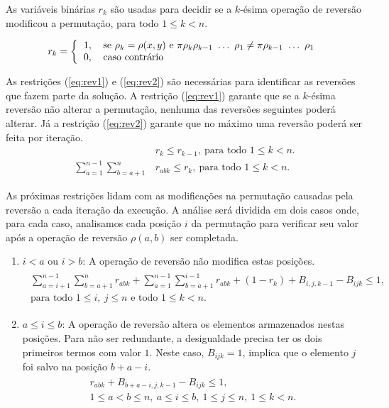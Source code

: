 As variáveis binárias $r_{k}$ são usadas para decidir se a $k$-ésima
operação de reversão modificou a permutação, para todo $ 1 \le k < n$.

\[
r_{k} = \left \{ 
\begin{tabular}{ll} 
 1, & se $\rho_{k} = \rho(x,y)$ e
 $\pi \rho_{k} \rho_{k-1}~\ldots~\rho_{1} \neq \pi \rho_{k-1}~\ldots~\rho_{1}$\\
 0, & caso contrário 
\end{tabular}
\right .
\]

As restrições (\ref{eq:rev1}) e (\ref{eq:rev2}) são necessárias para
identificar as reversões que fazem parte da solução. A restrição
(\ref{eq:rev1}) garante que se a $k$-ésima reversão não alterar a
permutação, nenhuma das reversões seguintes poderá alterar. Já a
restrição (\ref{eq:rev2}) garante que no máximo uma reversão poderá ser
feita por iteração.
\begin{align}
  &r_{k} \le r_{k-1},~\text{para todo $1 \le k <
  n$}. \label{eq:rev1} \\
  \sum_{a=1}^{n-1}\sum_{b=a+1}^{n}
  &r_{abk} \le r_{k},~\text{para todo $1 \le k < n$}. \label{eq:rev2}
\end{align}

As próximas restrições lidam com as modificações na permutação causadas
pela reversão a cada iteração da execução. A análise será dividida em
dois casos onde, para cada caso, analisamos cada posição $i$ da
permutação para verificar seu valor após a operação de reversão
$\rho(a,b)$ ser completada.
\begin{enumerate}
\item{$i < a$ ou $i > b$:
A operação de reversão não modifica estas posições.
\begin{align}
  \begin{split}
    \sum_{a=i+1}^{n-1}\sum_{b=a+1}^{n} r_{abk} +
    \sum_{a=1}^{n-1}\sum_{b=a+1}^{i-1} r_{abk} +
    (1 - r_{k}) + B_{i,j,k-1} - B_{ijk} \le 1, \\
    \text{para todo $1 \le i,~j \le n$ e todo $1 \le k < n$}.
  \end{split}
  \label{eq:rev3}
\end{align}}
\item{$a \le i \le b$:
A operação de reversão altera os elementos armazenados nestas posições.
Para não ser redundante, a desigualdade precisa ter os dois primeiros
termos com valor $1$. Neste caso, $B_{ijk} = 1$, implica que o elemento
$j$ foi salvo na posição $b + a - i$.
\begin{align}
  \begin{split}
  r_{abk} + B_{b+a-i,j,k-1} - B_{ijk} \le 1, \\
  \text{$1 \le a < b \le n,~a \le i \le b,~1 \le j
    \le n,~1 \le k < n$}.
  \end{split}
  \label{eq:rev4}
\end{align}}
\end{enumerate}

